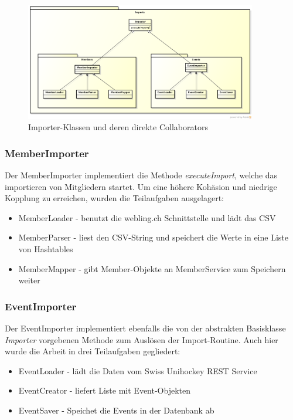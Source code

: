     \begin{figure}[h]
  		\vspace{-5pt}
    	\centering
    	 \includegraphics[width=0.9\textwidth]{content/architekturdokumentation/images/ImportPackageDesign.png}
  		\vspace{-25pt}
		\caption{Importer-Klassen und deren direkte Collaborators}
	\end{figure}
	
	\subsubsection{MemberImporter}
	Der MemberImporter implementiert die Methode \textit{executeImport}, welche das importieren von Mitgliedern startet. Um eine höhere Kohäsion und niedrige Kopplung zu erreichen, wurden die Teilaufgaben ausgelagert:
	\\\begin{itemize}	
		\item MemberLoader - benutzt die webling.ch Schnittstelle und lädt das CSV
		\item MemberParser - liest den CSV-String und speichert die Werte in eine Liste von Hashtables
		\item MemberMapper - gibt Member-Objekte an MemberService zum Speichern weiter\\
	\end{itemize}



	\subsubsection{EventImporter}
	Der EventImporter implementiert ebenfalls die von der abstrakten Basisklasse \textit{Importer} vorgebenen Methode zum Auslösen der Import-Routine. Auch hier wurde die Arbeit in drei Teilaufgaben gegliedert:
	\\\begin{itemize}	
		\item EventLoader - lädt die Daten vom Swiss Unihockey REST Service
		\item EventCreator - liefert Liste mit Event-Objekten
		\item EventSaver - Speichet die Events in der Datenbank ab\\
	\end{itemize}
	
